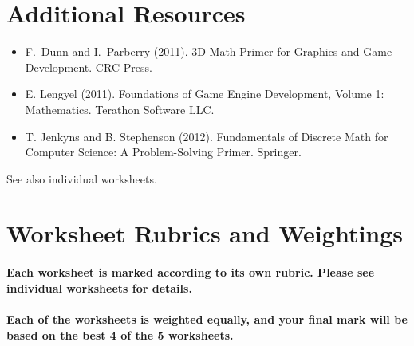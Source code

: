 \documentclass{../../fal_assignment}
\begin{document}
\section*{Additional Resources}

\begin{itemize}
    \item F.\ Dunn and I.\ Parberry (2011). 3D Math Primer for Graphics and Game Development. CRC Press.
    \item E. Lengyel (2011). Foundations of Game Engine Development, Volume 1: Mathematics. Terathon Software LLC.
    \item T. Jenkyns and B. Stephenson (2012). Fundamentals of Discrete Math for Computer Science: A Problem-Solving Primer. Springer.
\end{itemize}

See also individual worksheets.

\section*{Worksheet Rubrics and Weightings}

\paragraph{Each worksheet is marked according to its own rubric. Please see individual worksheets for details.}

\paragraph{Each of the worksheets is \textbf{weighted equally}, and your final mark will be based on the \textbf{best 4 of the 5} worksheets.}


\end{document}
